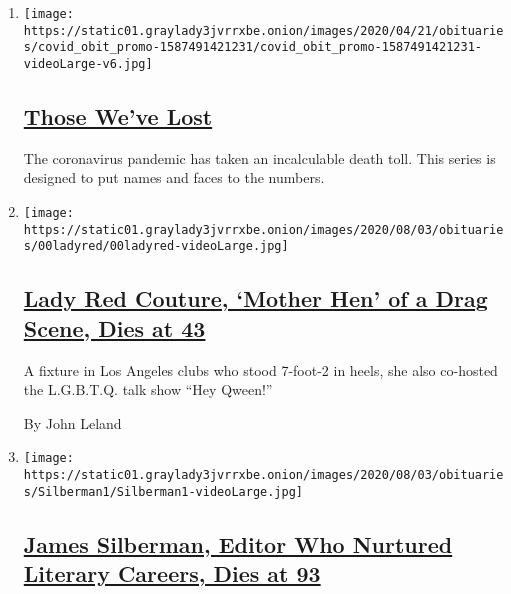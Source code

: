 \begin{enumerate}
\def\labelenumi{\arabic{enumi}.}
\item
  \texttt{[image: https://static01.graylady3jvrrxbe.onion/images/2020/04/21/obituaries/covid\_obit\_promo-1587491421231/covid\_obit\_promo-1587491421231-videoLarge-v6.jpg]}

  \hypertarget{those-weve-lost}{%
  \subsection{\texorpdfstring{\href{https://www.nytimes3xbfgragh.onion/interactive/2020/obituaries/people-died-coronavirus-obituaries.html}{Those
  We've Lost}}{Those We've Lost}}\label{those-weve-lost}}

  The coronavirus pandemic has taken an incalculable death toll. This
  series is designed to put names and faces to the numbers.
\item
  \texttt{[image: https://static01.graylady3jvrrxbe.onion/images/2020/08/03/obituaries/00ladyred/00ladyred-videoLarge.jpg]}

  \hypertarget{lady-red-couture-mother-hen-of-a-drag-scene-dies-at-43}{%
  \subsection{\texorpdfstring{\href{/2020/08/01/arts/lady-red-couture-dead.html}{Lady
  Red Couture, `Mother Hen' of a Drag Scene, Dies at
  43}}{Lady Red Couture, `Mother Hen' of a Drag Scene, Dies at 43}}\label{lady-red-couture-mother-hen-of-a-drag-scene-dies-at-43}}

  A fixture in Los Angeles clubs who stood 7-foot-2 in heels, she also
  co-hosted the L.G.B.T.Q. talk show ``Hey Qween!''

  By John Leland
\item
  \texttt{[image: https://static01.graylady3jvrrxbe.onion/images/2020/08/03/obituaries/Silberman1/Silberman1-videoLarge.jpg]}

  \hypertarget{james-silberman-editor-who-nurtured-literary-careers-dies-at-93}{%
  \subsection{\texorpdfstring{\href{/2020/08/01/books/james-silberman-dead.html}{James
  Silberman, Editor Who Nurtured Literary Careers, Dies at
  93}}{James Silberman, Editor Who Nurtured Literary Careers, Dies at 93}}\label{james-silberman-editor-who-nurtured-literary-careers-dies-at-93}}


\end{enumerate}
